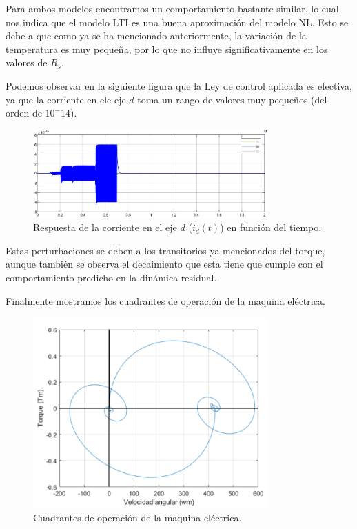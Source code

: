 \documentclass{article}
\begin{document}
Para ambos modelos encontramos un comportamiento bastante similar, lo cual nos indica que el modelo LTI
es una buena aproximación del modelo NL. Esto se debe a que como ya se ha mencionado anteriormente, la 
variación de la temperatura es muy pequeña, por lo que no influye significativamente en los valores de $R_s$.

Podemos observar en la siguiente figura que la Ley de control aplicada es efectiva, ya que la corriente
en ele eje $d$ toma un rango de valores muy pequeños (del orden de $10^-14$).

\begin{figure}[H]
    \centering
    \includegraphics[width=0.8\textwidth]{5.1.6_id.jpg}
    \caption{Respuesta de la corriente en el eje $d$ ($i_d(t)$) en función del tiempo.}
\end{figure}

Estas perturbaciones se deben a los transitorios ya mencionados del torque, aunque también se observa 
el decaimiento que esta tiene que cumple con el comportamiento predicho en la dinámica residual. 

Finalmente mostramos los cuadrantes de operación de la maquina eléctrica.

\begin{figure}[H]
    \centering
    \includegraphics[width=0.8\textwidth]{5.1.6_torque_velocidad.png}
    \caption{Cuadrantes de operación de la maquina eléctrica.}
\end{figure}
\end{document}
